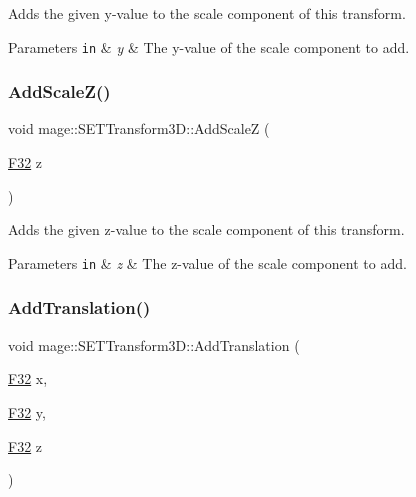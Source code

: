 Adds the given y-\/value to the scale component of this transform.


\begin{DoxyParams}[1]{Parameters}
\mbox{\tt in}  & {\em y} & The y-\/value of the scale component to add. \\
\hline
\end{DoxyParams}
\mbox{\label{classmage_1_1_s_e_t_transform3_d_ad841cfeaf041523e7d9dc4bb7cf1384d}} 
\subsubsection{\texorpdfstring{Add\+Scale\+Z()}{AddScaleZ()}}
{\footnotesize\ttfamily void mage\+::\+S\+E\+T\+Transform3\+D\+::\+Add\+ScaleZ (\begin{DoxyParamCaption}\item[{\mbox{\hyperlink{namespacemage_aa97e833b45f06d60a0a9c4fc22ae02c0}{F32}}}]{z }\end{DoxyParamCaption})\hspace{0.3cm}{\ttfamily [noexcept]}}

Adds the given z-\/value to the scale component of this transform.


\begin{DoxyParams}[1]{Parameters}
\mbox{\tt in}  & {\em z} & The z-\/value of the scale component to add. \\
\hline
\end{DoxyParams}
\mbox{\label{classmage_1_1_s_e_t_transform3_d_a7de1b5e14856a9b16b10c3a9fd84fa54}} 
\subsubsection{\texorpdfstring{Add\+Translation()}{AddTranslation()}\hspace{0.1cm}{\footnotesize\ttfamily [1/3]}}
{\footnotesize\ttfamily void mage\+::\+S\+E\+T\+Transform3\+D\+::\+Add\+Translation (\begin{DoxyParamCaption}\item[{\mbox{\hyperlink{namespacemage_aa97e833b45f06d60a0a9c4fc22ae02c0}{F32}}}]{x,  }\item[{\mbox{\hyperlink{namespacemage_aa97e833b45f06d60a0a9c4fc22ae02c0}{F32}}}]{y,  }\item[{\mbox{\hyperlink{namespacemage_aa97e833b45f06d60a0a9c4fc22ae02c0}{F32}}}]{z }\end{DoxyParamCaption})\hspace{0.3cm}{\ttfamily [noexcept]}}


